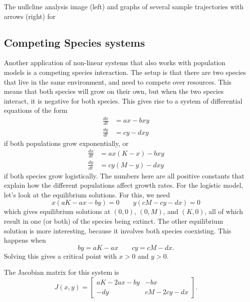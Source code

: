 \documentclass{ximera}
\begin{document}
\begin{myfig}
    \capstart
    \caption{The nullcline analysis image (left) and graphs of several sample trajectories with arrows (right) for  \label{fig:nlin-pred-prey-nc}}
\end{myfig}

\subsection{Competing Species systems}

Another application of non-linear systems that also works with population models is a competing species interaction. The setup is that there are two species that live in the same environment, and need to compete over resources. This means that both species will grow on their own, but when the two species interact, it is negative for both species. This gives rise to a system of differential equations of the form
\[
    \begin{split}
        \frac{dx}{dt}&= ax - bxy \\
        \frac{dy}{dt}&= cy - dxy  
    \end{split}
\]
if both populations grow exponentially, or
\[
    \begin{split}
        \frac{dx}{dt}&= ax(K-x) - bxy \\
        \frac{dy}{dt}&= cy(M-y) - dxy  
    \end{split}
\]
if both species grow logistically. The numbers here are all positive constants that explain how the different populations affect growth rates.  For the logistic model, let's look at the equilibrium solutions. For this, we need
\[ 
    x(aK - ax - by) = 0 \qquad y(cM - cy - dx) = 0 
\] 
which gives equilibrium solutions at $(0,0)$, $(0, M)$, and $(K, 0)$, all of which result in one (or both) of the species being extinct. The other equilibrium solution is more interesting, because it involves both species coexisting. This happens when 
\[ 
    by = aK - ax \qquad cy = cM - dx. 
\] 
Solving this gives a critical point with $x > 0$ and $y>0$. 

The Jacobian matrix for this system is
\[ 
    J(x,y) = 
    \begin{bmatrix} 
        aK - 2ax - by & -bx \\ 
        -dy & cM - 2cy - dx 
    \end{bmatrix} .
\]
\end{document}
